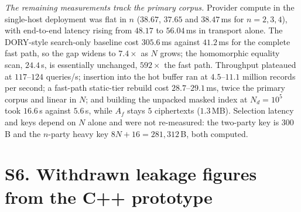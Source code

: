 \documentclass[11pt,a4paper]{article}
\begin{document}
\emph{The remaining measurements track the primary corpus.} Provider compute
in the single-host deployment was flat in $n$ ($38.67$, $37.65$ and
$38.47$\,ms for $n=2,3,4$), with end-to-end latency rising from $48.17$ to
$56.04$\,ms in transport alone. The DORY-style search-only baseline cost
$305.6$\,ms against $41.2$\,ms for the complete fast path, so the gap widens to
$7.4\times$ as $N$ grows; the homomorphic equality scan, $24.4$\,s, is
essentially unchanged, $592\times$ the fast path. Throughput plateaued at
$117$--$124$ queries/s; insertion into the hot buffer ran at $4.5$--$11.1$
million records per second; a fast-path static-tier rebuild cost
$28.7$--$29.1$\,ms, twice the primary corpus and linear in $N$; and building
the unpacked masked index at $N_d=10^5$ took $16.6$\,s against $5.6$\,s, while
$A_f$ stays $5$ ciphertexts ($1.3$\,MB). Selection latency and keys depend on
$N$ alone and were not re-measured: the two-party key is $300$\,B and the
$n$-party heavy key $8N+16=281{,}312$\,B, both computed.

\section*{S6. Withdrawn leakage figures from the C++ prototype}
\end{document}
